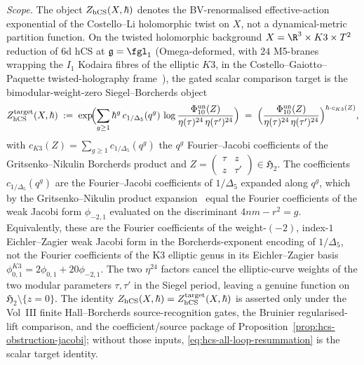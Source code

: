 \begin{theorem}
\label{thm:hcs-all-loop-resummation}
\emph{Scope.} The object $Z_{\mathrm{hCS}}(X,\hbar)$ denotes the
BV-renormalised effective-action exponential of the Costello--Li
holomorphic twist on $X$, not a dynamical-metric partition function.
On the twisted holomorphic background
$X = \R^{3}\times K3\times T^{2}$ reduction of 6d hCS at $\fg = \fgl_{1}$
(Omega-deformed, with $24$ M5-branes wrapping the $I_{1}$ Kodaira
fibres of the elliptic $K3$, in the Costello--Gaiotto--Paquette
twisted-holography frame~\cite{CostelloGaiottoPaquette2018}), the
gated scalar comparison target is the bimodular-weight-zero
Siegel--Borcherds object
\begin{equation}\label{eq:hcs-all-loop-resummation}
 Z_{\mathrm{hCS}}^{\mathrm{target}}(X,\hbar)
 \;:=\;
 \exp\!\Bigl(
 \sum_{g\ge 1}\hbar^{g}\,
 c_{1/\Delta_{5}}(q^{g})\,\log\frac{\Phi_{10}^{\mathrm{un}}(Z)}{\eta(\tau)^{24}\,\eta(\tau')^{24}}\Bigr)
 \;=\;
 \Bigl(\frac{\Phi_{10}^{\mathrm{un}}(Z)}{\eta(\tau)^{24}\,\eta(\tau')^{24}}\Bigr)^{\hbar\cdot c_{K3}(Z)},
\end{equation}
with $c_{K3}(Z) = \sum_{g\ge 1}c_{1/\Delta_{5}}(q^{g})$ the $q^{g}$
Fourier--Jacobi coefficients of the Gritsenko--Nikulin Borcherds
product and $Z=\begin{pmatrix}\tau&z\\z&\tau'\end{pmatrix}\in\mathfrak H_{2}$.
The coefficients $c_{1/\Delta_{5}}(q^{g})$ are the Fourier--Jacobi
coefficients of $1/\Delta_5$ expanded along $q^g$, which by the
Gritsenko--Nikulin product expansion~\cite[(2.2)]{GritsenkoNikulin1998}
equal the Fourier coefficients of the weak Jacobi form
$\phi_{-2,1}$ evaluated on the discriminant $4nm - r^2 = g$.
Equivalently, these are the Fourier coefficients of the weight-$(-2)$,
index-$1$ Eichler--Zagier weak Jacobi form in the Borcherds-exponent
encoding of $1/\Delta_5$, not the Fourier coefficients of the K3
elliptic genus in its Eichler--Zagier basis
$\phi_{0,1}^{K3} = 2\phi_{0,1} + 20\phi_{-2,1}$. The two $\eta^{24}$
factors cancel the elliptic-curve weights of the two modular
parameters $\tau,\tau'$ in the Siegel period, leaving a genuine
function on $\mathfrak H_{2}\setminus\{z=0\}$.  The identity
$Z_{\mathrm{hCS}}(X,\hbar)=Z_{\mathrm{hCS}}^{\mathrm{target}}(X,\hbar)$ is asserted
only under the Vol~III finite Hall--Borcherds source-recognition gates,
the Bruinier regularised-lift comparison, and the coefficient/source
package of Proposition~\ref{prop:hcs-obstruction-jacobi}; without
those inputs, \eqref{eq:hcs-all-loop-resummation} is the scalar target
identity.
\end{theorem}

